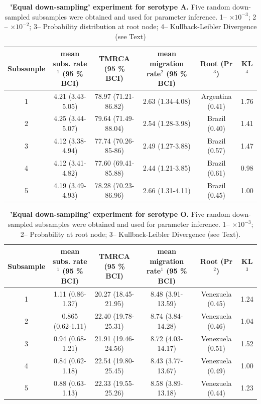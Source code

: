 \documentclass[a4paper,10pt]{article}
\begin{document}
\newpage
\begin{table}
\medskip
\begin{minipage}{\textwidth} 
\begin{center}
\caption{ {{\bf 'Equal down-sampling' experiment for serotype A.}} 
Five random down-sampled subsamples were obtained and used for parameter inference.
1-- $\times 10^{-3}$; 2 -- $\times 10^{-2}$; 3-- Probability distribution at root node; 4-- Kullback-Leibler Divergence (see Text) }
\begin{tabular}{cccccc}
\toprule
Subsample	&mean subs. rate$^{1}$ (95 \% BCI)	&TMRCA (95 \% BCI)	&mean migration rate$^{2}$  (95 \% BCI)	&Root (Pr$^{3}$)& KL$^4$\\
\midrule
1	&4.21 (3.43-5.05)	&78.97 (71.21-86.82)	&2.63 (1.34-4.08)	&Argentina (0.41)& 1.76\\
2	&4.25 (3.44-5.07)	&79.64 (71.49-88.04)	&2.54 (1.28-3.98)	&Brazil (0.40)& 1.41\\
3	&4.12 (3.38-4.94)	&77.74 (70.26-85-86)	&2.49 (1.27-3.88)	&Brazil (0.57)&1.47\\
4	&4.12 (3.41-4.82)	&77.60 (69.41-85.88)	&2.44 (1.21-3.85)	&Brazil (0.61)&0.98\\
5	&4.19 (3.49-4.93)	&78.28 (70.23-86.96)	&2.66 (1.31-4.11)	&Brazil (0.45)& 1.00\\
\bottomrule
\end{tabular}
\label{stab:ED_A}
\end{center}
\end{minipage}
\end{table}

\newpage
\begin{table}
\medskip
\begin{minipage}{\textwidth}
\begin{center}
 \caption{ {{\bf 'Equal down-sampling' experiment for serotype O.}} Five random down-sampled subsamples were obtained and used for parameter inference.
1-- $\times 10^{-3}$; 2--  Probability at root node; 3-- Kullback-Leibler Divergence (see Text).}
\begin{tabular}{cccccc}
\toprule
Subsample	&mean subs. rate$^{1}$ (95 \% BCI)	&TMRCA (95 \% BCI)	&mean migration rate$^{1}$ (95 \% BCI)	&Root (Pr$^{2}$) & KL$^3$\\
\midrule
1	&1.11 (0.86-1.37)	&20.27 (18.45-21.95)	&8.48 (3.91-13.59)	&Venezuela (0.45)& 1.24\\
2	&0.865 (0.62-1.11)	&22.40 (19.78-25.31)	&8.74 (3.84-14.28)	&Venezuela (0.46)&1.04\\
3	&0.94 (0.68-1.21)	&21.91 (19.46-24.56)	&8.72 (4.03-14.17)	&Venezuela (0.51)&1.52\\
4	&0.84 (0.62-1.18)	&22.54 (19.80-25.45)	&8.43 (3.77-13.67)	&Venezuela (0.49)&1.00\\
5	&0.88 (0.63-1.13)	&22.33 (19.55-25.26)	&8.58 (3.89-13.18)	&Venezuela (0.44)&1.23\\

\bottomrule
\end{tabular}
\label{stab:ED_O}
\end{center}
\end{minipage}
\end{table}
\end{document}
